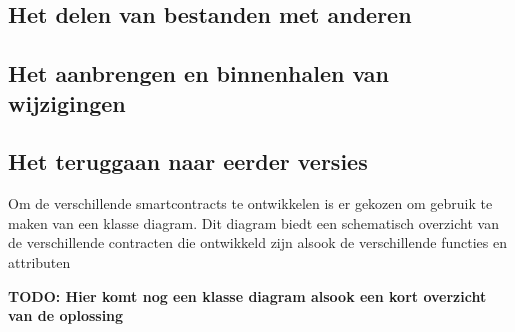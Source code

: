 \subsection{Het delen van bestanden met anderen}

\subsection{Het aanbrengen en binnenhalen van wijzigingen}

\subsection{Het teruggaan naar eerder versies}

Om de verschillende smartcontracts te ontwikkelen is er gekozen om gebruik te maken van een klasse diagram. Dit diagram biedt een schematisch overzicht van de verschillende contracten die ontwikkeld zijn alsook de verschillende functies en attributen

\textbf{TODO: Hier komt nog een klasse diagram alsook een kort overzicht van de oplossing}